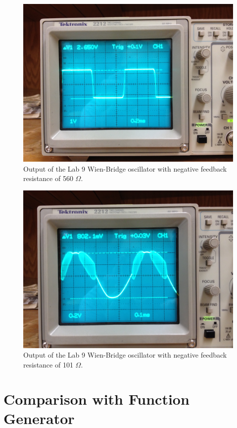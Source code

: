 \documentclass[12pt,letterpaper]{report}
\newlength \figwidth
\begin{document}
\begin{figure}[H]
\centering
\includegraphics[width=\figwidth, keepaspectratio=true]{lab9_images/before.jpg}
\caption{Output of the Lab 9 Wien-Bridge oscillator with negative feedback resistance of 560 $\Omega$.}
\label{fig:before}
\end{figure}

\begin{figure}[H]
\centering
\includegraphics[width=\figwidth, keepaspectratio=true]{lab9_images/after.jpg}
\caption{Output of the Lab 9 Wien-Bridge oscillator with negative feedback resistance of 101 $\Omega$.}
\label{fig:after}
\end{figure}

\section*{Comparison with Function Generator}
\end{document}

